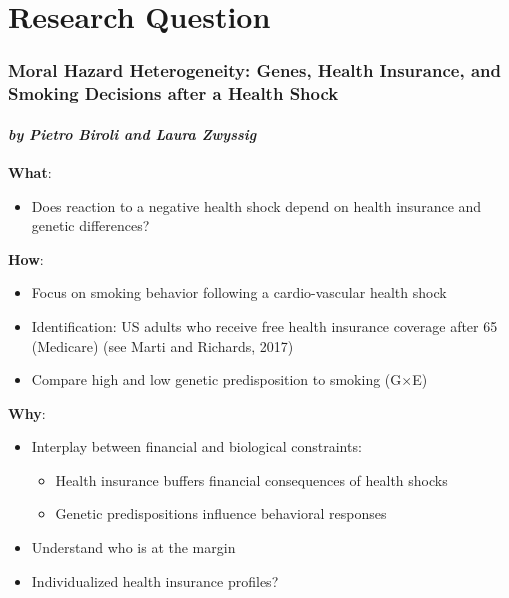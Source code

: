 \documentclass[10pt,compress,xcolor=dvipsnames]{beamer}    %
\begin{document}
%
%
\section{Research Question}
\begin{frame}
\frametitle{Moral Hazard Heterogeneity: Genes, Health Insurance, and Smoking Decisions after a Health Shock}
\framesubtitle{\hspace{33ex} \textit{by Pietro Biroli and Laura Zwyssig}}

\textbf{What}:
	\begin{itemize}
		\item Does reaction to a negative health shock depend on health insurance and genetic differences?
	\end{itemize}

  \vspace{2ex}

\textbf{How}:
\begin{itemize}
  \item Focus on smoking behavior following a cardio-vascular health shock
  \item Identification: US adults who receive free health insurance coverage after 65 (Medicare) (see Marti and Richards, 2017)
  \item Compare high and low genetic predisposition to smoking (G$\times$E)
\end{itemize}

  \vspace{2ex}

\textbf{Why}:
\begin{itemize}
		\item Interplay between financial and biological constraints:
		\begin{itemize}
			\item Health insurance buffers financial consequences of health shocks
			\item Genetic predispositions influence behavioral responses
		\end{itemize}
			\item Understand who is at the margin
		\item Individualized health insurance profiles?
\end{itemize}
\end{frame}
\end{document}
